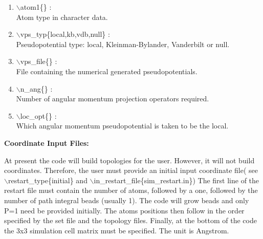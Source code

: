 \documentclass[12pt]{article}
\begin{document}
\begin{itemize}
\begin{enumerate}
 \vspace{0.15in} \Large
 \item  $\backslash$atom1\{\} : \\
    \large
    Atom type in character data.

 \vspace{0.15in} \Large
 \item  $\backslash$vps\_typ\{local,kb,vdb,null\} : \\
    \large
    Pseudopotential type: local, Kleinman-Bylander, Vanderbilt or null.

 \vspace{0.15in} \Large
 \item  $\backslash$vps\_file\{\} : \\
    \large
    File containing the numerical generated pseudopotentials.

 \vspace{0.15in} \Large
 \item  $\backslash$n\_ang\{\} : \\
    \large
    Number of angular momentum projection operators required.

 \vspace{0.15in} \Large
 \item  $\backslash$loc\_opt\{\} : \\
    \large
    Which angular momentum pseudopotential is taken to be the local.

\end{enumerate}

  \end{itemize}

\clearpage
\begin{center}
\huge
{\bf Coordinate Input Files: } 
\end{center}
\large

At present the code will build topologies for the user. However,
it will not build coordinates. Therefore, the user must provide
an initial input coordinate file( see $\backslash$restart\_type\{initial\}
and $\backslash$in\_restart\_file\{sim\_restart.in\})
The first line of the restart file must contain the number of atoms,
followed by a one, followed by the number of path integral beads 
(usually 1). The code will grow beads and only P=1 need be provided
initially. The atoms positions then follow in the order specified by
the set file and the topology files. Finally, at the bottom of
the code the 3x3 simulation cell matrix must be specified.
The unit is Angstrom.
\end{document}
